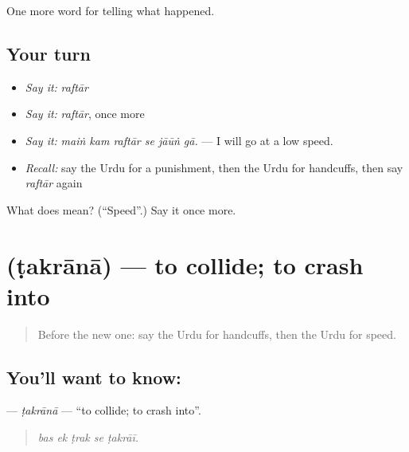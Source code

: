 \begin{grammarlens}[title={What you've built}]
One more word for telling what happened.
\end{grammarlens}

\subsection*{Your turn}
\begin{itemize}
\raggedright
  \item \emph{Say it:} \emph{raftār}
  \item \emph{Say it:} \emph{raftār}, once more
  \item \emph{Say it:} \emph{maiṅ kam raftār se jāūṅ gā.} — I will go at a low speed.
  \item \emph{Recall:} say the Urdu for a punishment, then the Urdu for handcuffs, then say \emph{raftār} again
\end{itemize}

\begin{tcolorbox}[breakable,colback=teal!4,colframe=teal!35!black,title={Before you move on}]
What does  mean? (\textquotedblleft{}Speed\textquotedblright{}.) Say it once more.
\end{tcolorbox}
\section[\texorpdfstring{\ur{ٹکرانا} (ṭakrānā)}{ٹکرانا (ṭakrānā)}]{ (ṭakrānā) — to collide; to crash into}

\label{lesson:UR-C284-takrana}



\begin{quote}
Before the new one: say the Urdu for handcuffs, then the Urdu for speed.
\end{quote}

\subsection*{You'll want to know: }
\textbf{} — \emph{ṭakrānā} — \textquotedblleft{}to collide; to crash into\textquotedblright{}.

\begin{quote}
    
\end{quote}

\begin{quote}
\emph{bas ek ṭrak se ṭakrāī.}
\end{quote}

